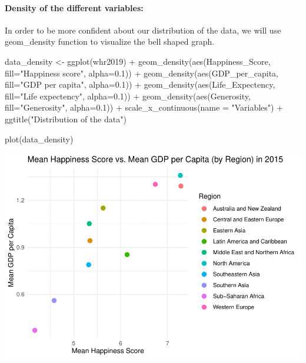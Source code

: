 \documentclass[
]{article}
\newenvironment{Shaded}{\begin{snugshade}}{\end{snugshade}}
\newcommand{\AttributeTok}[1]{\textcolor[rgb]{0.77,0.63,0.00}{#1}}
\newcommand{\FloatTok}[1]{\textcolor[rgb]{0.00,0.00,0.81}{#1}}
\newcommand{\FunctionTok}[1]{\textcolor[rgb]{0.00,0.00,0.00}{#1}}
\newcommand{\NormalTok}[1]{#1}
\newcommand{\OtherTok}[1]{\textcolor[rgb]{0.56,0.35,0.01}{#1}}
\newcommand{\SpecialCharTok}[1]{\textcolor[rgb]{0.00,0.00,0.00}{#1}}
\newcommand{\StringTok}[1]{\textcolor[rgb]{0.31,0.60,0.02}{#1}}
\begin{document}
\hfill\break

\hypertarget{density-of-the-different-variables}{%
\paragraph{Density of the different
variables:}\label{density-of-the-different-variables}}

In order to be more confident about our distribution of the data, we
will use geom\_density function to visualize the bell shaped graph.

\begin{Shaded}
\begin{Highlighting}[]
\NormalTok{data\_density }\OtherTok{\textless{}{-}} \FunctionTok{ggplot}\NormalTok{(whr2019) }\SpecialCharTok{+}
  \FunctionTok{geom\_density}\NormalTok{(}\FunctionTok{aes}\NormalTok{(Happiness\_Score, }\AttributeTok{fill=}\StringTok{"Happiness score"}\NormalTok{, }\AttributeTok{alpha=}\FloatTok{0.1}\NormalTok{)) }\SpecialCharTok{+} 
  \FunctionTok{geom\_density}\NormalTok{(}\FunctionTok{aes}\NormalTok{(GDP\_per\_capita, }\AttributeTok{fill=}\StringTok{"GDP per capita"}\NormalTok{, }\AttributeTok{alpha=}\FloatTok{0.1}\NormalTok{)) }\SpecialCharTok{+} 
  \FunctionTok{geom\_density}\NormalTok{(}\FunctionTok{aes}\NormalTok{(Life\_Expectency, }\AttributeTok{fill=}\StringTok{"Life expectency"}\NormalTok{, }\AttributeTok{alpha=}\FloatTok{0.1}\NormalTok{)) }\SpecialCharTok{+} 
  \FunctionTok{geom\_density}\NormalTok{(}\FunctionTok{aes}\NormalTok{(Generosity, }\AttributeTok{fill=}\StringTok{"Generosity"}\NormalTok{, }\AttributeTok{alpha=}\FloatTok{0.1}\NormalTok{)) }\SpecialCharTok{+} 
    \FunctionTok{scale\_x\_continuous}\NormalTok{(}\AttributeTok{name =} \StringTok{"Variables"}\NormalTok{) }\SpecialCharTok{+}
  \FunctionTok{ggtitle}\NormalTok{(}\StringTok{"Distribution of the data"}\NormalTok{)}
  
\FunctionTok{plot}\NormalTok{(data\_density)}
\end{Highlighting}
\end{Shaded}

\includegraphics{World-Happiness_files/figure-latex/unnamed-chunk-4-1.pdf}
\end{document}
